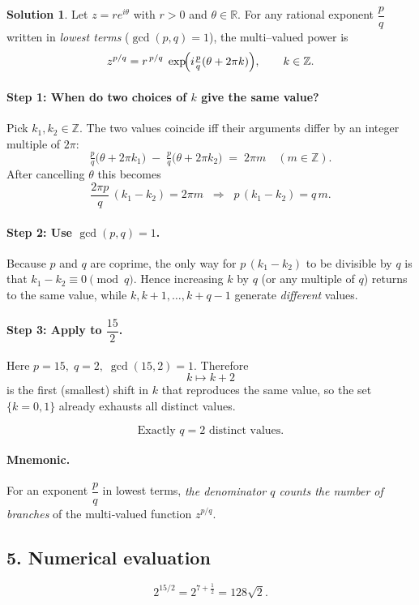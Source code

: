 \documentclass[12pt]{article}
\theoremstyle{definition} %
\newtheorem{solution}{Solution}
\theoremstyle{plain} %
\begin{document}
\begin{solution}
Let \(z=re^{i\theta}\) with \(r>0\) and \(\theta\in\mathbb{R}\).
For any rational exponent \(\dfrac{p}{q}\) written in \emph{lowest terms}
(\(\gcd(p,q)=1\)),
the multi–valued power is  
\[
   z^{p/q}=r^{\,p/q}\;
            \exp\!\Bigl(i\tfrac{p}{q}(\theta+2\pi k)\Bigr),
   \qquad k\in\mathbb{Z}.
\]

\paragraph{Step 1:  When do two choices of \(k\) give the same value?}
Pick \(k_1,k_2\in\mathbb{Z}\).  
The two values coincide iff their arguments differ by an integer multiple of
\(2\pi\):
\[
  \tfrac{p}{q}\bigl(\theta+2\pi k_1\bigr)
  \;-\;
  \tfrac{p}{q}\bigl(\theta+2\pi k_2\bigr)
  \;=\;
  2\pi m
  \quad(m\in\mathbb{Z}).
\]
After cancelling \(\theta\) this becomes
\[
   \frac{2\pi p}{q}\,(k_1-k_2)=2\pi m
   \;\;\Longrightarrow\;\;
   p\,(k_1-k_2)=q\,m.
\]

\paragraph{Step 2:  Use \(\gcd(p,q)=1\).}
Because \(p\) and \(q\) are coprime, the only way for
\(p\,(k_1-k_2)\) to be divisible by \(q\) is that
\(\boxed{k_1-k_2\equiv 0\pmod{q}}\).
Hence increasing \(k\) by \(q\) (or any multiple of \(q\)) returns to the
same value, while \(k,k+1,\dots,k+q-1\) generate \emph{different} values.

\paragraph{Step 3:  Apply to \(\dfrac{15}{2}\).}
Here \(p=15,\;q=2,\;\gcd(15,2)=1\).
Therefore  
\[
   k\mapsto k+2
\]
is the first (smallest) shift in \(k\) that reproduces the same value, so the
set \(\{k=0,1\}\) already exhausts all distinct values.

\[
\boxed{\text{Exactly \(q=2\) distinct values.}}
\]

\paragraph{Mnemonic.}
For an exponent \(\dfrac{p}{q}\) in lowest terms,  
\emph{the denominator \(q\) counts the number of branches} of the
multi‑valued function \(z^{p/q}\).
  
  \subsection*{5.  Numerical evaluation}
  \[
    2^{15/2}=2^{7+\tfrac12}=128\sqrt{2}.
  \]
  

\end{solution}
\end{document}
